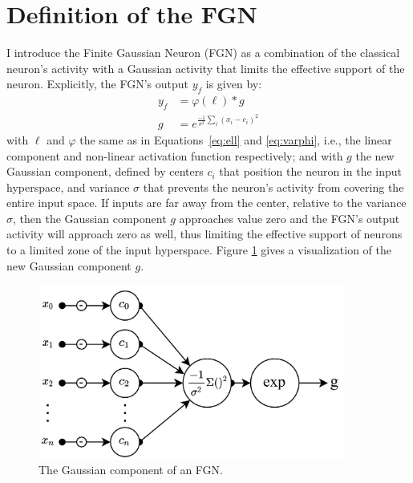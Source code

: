 \documentclass[12pt,oneside]{CUNY_PhD}
\begin{document}
\section{Definition of the FGN} \label{Definition of the FGN}
I introduce the Finite Gaussian Neuron (FGN) as a combination of the classical neuron's activity with a Gaussian activity that limits the effective support of the neuron. Explicitly, the FGN's output $y_f$ is given by:
\begin{align}
y_{f} &= \varphi(\ell) * g \\
g &= e^{\frac{-1}{\sigma^2}\sum_{i}(x_i-c_i)^2}
\end{align}
with $\ell$ and $\varphi$ the same as in Equations~\eqref{eq:ell} and \eqref{eq:varphi}, i.e., the linear component and non-linear activation function respectively; and with $g$ the new Gaussian component, defined by centers $c_i$ that position the neuron in the input hyperspace, and variance $\sigma$ that prevents the neuron's activity from covering the entire input space. If inputs are far away from the center, relative to the variance $\sigma$, then the Gaussian component $g$ approaches value zero and the FGN's output activity will approach zero as well, thus limiting the effective support of neurons to a limited zone of the input hyperspace. Figure \ref{fig:gaussian-comp} gives a visualization of the new Gaussian component $g$.
\begin{figure}[!t]
    \centering
    \includegraphics[width=0.9\textwidth]{images/fgn-gaussian-component.png}
    \caption{The Gaussian component of an FGN.}
    \label{fig:gaussian-comp}
\end{figure}
\end{document}
